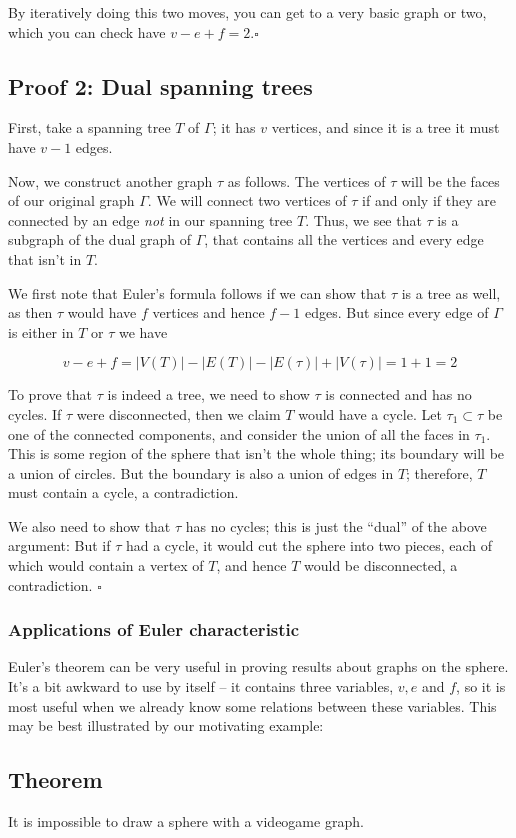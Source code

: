 \documentclass[]{article}
\begin{document}
By iteratively doing this two moves, you can get to a very basic graph
or two, which you can check have \(v-e+f=2.  \square\)

\subsection{Proof 2: Dual spanning
trees}\label{proof-2-dual-spanning-trees}

First, take a spanning tree \(T\) of \(\Gamma\); it has \(v\) vertices,
and since it is a tree it must have \(v-1\) edges.

Now, we construct another graph \(\tau\) as follows. The vertices of
\(\tau\) will be the faces of our original graph \(\Gamma\). We will
connect two vertices of \(\tau\) if and only if they are connected by an
edge \emph{not} in our spanning tree \(T\). Thus, we see that \(\tau\)
is a subgraph of the dual graph of \(\Gamma\), that contains all the
vertices and every edge that isn't in \(T\).

We first note that Euler's formula follows if we can show that \(\tau\)
is a tree as well, as then \(\tau\) would have \(f\) vertices and hence
\(f-1\) edges. But since every edge of \(\Gamma\) is either in \(T\) or
\(\tau\) we have

\[v-e+f=|V(T)|-|E(T)|-|E(\tau)|+|V(\tau)|=1+1=2\]

To prove that \(\tau\) is indeed a tree, we need to show \(\tau\) is
connected and has no cycles. If \(\tau\) were disconnected, then we
claim \(T\) would have a cycle. Let \(\tau_1\subset \tau\) be one of the
connected components, and consider the union of all the faces in
\(\tau_1\). This is some region of the sphere that isn't the whole
thing; its boundary will be a union of circles. But the boundary is also
a union of edges in \(T\); therefore, \(T\) must contain a cycle, a
contradiction.

We also need to show that \(\tau\) has no cycles; this is just the
``dual'' of the above argument: But if \(\tau\) had a cycle, it would
cut the sphere into two pieces, each of which would contain a vertex of
\(T\), and hence \(T\) would be disconnected, a contradiction.
\(\square\)

\subsubsection{Applications of Euler
characteristic}\label{applications-of-euler-characteristic}

Euler's theorem can be very useful in proving results about graphs on
the sphere. It's a bit awkward to use by itself -- it contains three
variables, \(v, e\) and \(f\), so it is most useful when we already know
some relations between these variables. This may be best illustrated by
our motivating example:

\subsection{Theorem}\label{theorem-1}

It is impossible to draw a sphere with a videogame graph.
\end{document}
